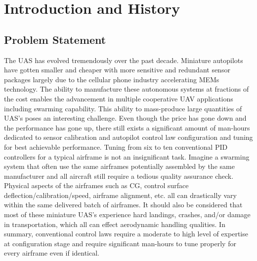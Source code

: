 \chapter{Introduction and History}\label{ch:intro}


\section{Problem Statement}
The UAS has evolved tremendously over the past decade.  Miniature autopilots have gotten smaller and cheaper with more sensitive and redundant sensor packages largely due to the cellular phone industry accelerating MEMs technology.  The ability to manufacture these autonomous systems at fractions of the cost enables the advancement in multiple cooperative UAV applications including swarming capability.  This ability to mass-produce large quantities of UAS's poses an interesting challenge.  Even though the price has gone down and the performance has gone up, there still exists a significant amount of man-hours dedicated to sensor calibration and autopilot control law configuration and tuning for best achievable performance.  Tuning from six to ten conventional PID controllers for a typical airframe is not an insignificant task.  Imagine a swarming system that often use the same airframes potentially assembled by the same manufacturer and all aircraft still require a tedious quality assurance check.  Physical aspects of the airframes such as CG, control surface deflection/calibration/speed, airframe alignment, etc. all can drastically vary within the same delivered batch of airframes.  It should also be considered that most of these miniature UAS's experience hard landings, crashes, and/or damage in transportation, which all can effect aerodynamic handling qualities.  In summary, conventional control laws require a moderate to high level of expertise at configuration stage and require significant man-hours to tune properly for every airframe even if identical.

